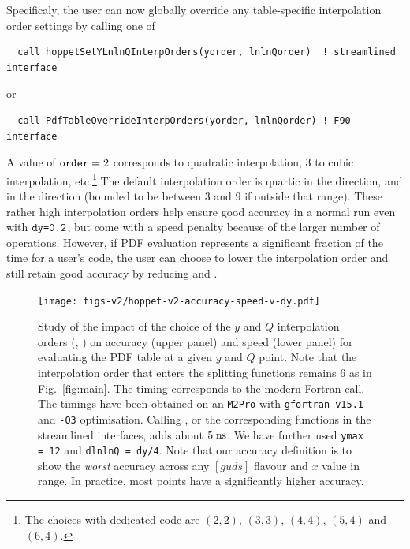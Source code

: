 Specificaly, the user can now globally override any table-specific interpolation order
settings by calling one of
\begin{lstlisting}
  call hoppetSetYLnlnQInterpOrders(yorder, lnlnQorder)  ! streamlined interface
\end{lstlisting}
or
\begin{lstlisting}
  call PdfTableOverrideInterpOrders(yorder, lnlnQorder) ! F90 interface
\end{lstlisting}
A value of $\texttt{order}=2$ corresponds to quadratic interpolation, $3$ to
cubic interpolation, etc.\footnote{The 
  choices with dedicated code are $(2,2)$, $(3,3)$, $(4,4)$, $(5,4)$
  and $(6,4)$.}
%
The default interpolation order is quartic in the 
direction, and  in the  direction (bounded
to be between 3 and 9 if outside that range).
%
These rather high interpolation orders help ensure good accuracy in a normal
\hoppet{} run even with $\texttt{dy=0.2}$, but come with a speed penalty
because of the larger number of operations.
%
However, if PDF evaluation represents a significant fraction of the
time for a user's code, the user can choose to lower the interpolation
order and still retain good accuracy by reducing  and
.

\begin{figure}[tbp]
    \centering
        \texttt{[image: figs-v2/hoppet-v2-accuracy-speed-v-dy.pdf]}
    \caption{
      Study of the impact of the choice of the $y$ and $Q$ interpolation
      orders (, ) on accuracy (upper panel) and speed
      (lower panel) for evaluating
      the PDF table at a given $y$ and $Q$ point.
      Note that the interpolation order that enters the splitting
      functions remains $6$ as in Fig.~\ref{fig:main}.
      The timing corresponds to the  modern
      Fortran call.
      The timings have been
      obtained on an \texttt{M2Pro} with \texttt{gfortran v15.1} and
      \texttt{-O3} optimisation.
      Calling , or the corresponding
      functions in the streamlined interfaces, adds about $5\;\mathrm{ns}$.
      We have further used \texttt{ymax = 12} and
      \texttt{dlnlnQ = dy/4}.
      Note that our accuracy definition is to show the \emph{worst}
      accuracy across any $[guds]$ flavour and $x$ value in range.
      In practice, most points have a significantly higher accuracy.
    }
        \label{fig:interp-accuracy}
\end{figure}


